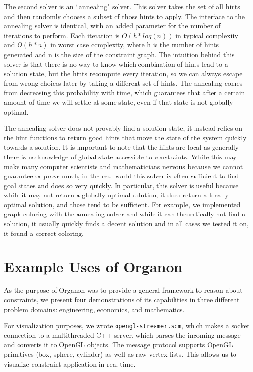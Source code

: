 \documentclass[12pt,a4paper]{article}
\begin{document}
The second solver is an ``annealing" solver. This solver takes the set of all hints and then randomly chooses a subset of those hints to apply. The interface to the annealing solver is identical, with an added parameter for the number of iterations to perform. Each iteration is $O(h * log(n))$ in typical complexity and $O(h*n)$ in worst case complexity, where h is the number of hints generated and n is the size of the constraint graph.   The intuition behind this solver is that there is no way to know which combination of hints lead to a solution state, but the hints recompute every iteration, so we can always escape from wrong choices later by taking a different set of hints.  The annealing comes from decreasing this probability with time, which guarantees that after a certain amount of time we will settle at some state, even if that state is not globally optimal.  

The annealing solver does not provably find a solution state, it instead relies on the hint functions to return good hints that move the state of the system quickly towards a solution.  It is important to note that the hints are local as generally there is no knowledge of global state accessible to constraints.  While this may make many computer scientists and mathematicians nervous because we cannot guarantee or prove much, in the real world this solver is often sufficient to find goal states and does so very quickly.  In particular, this solver is useful because while it may not return a globally optimal solution, it does return a locally optimal solution, and those tend to be sufficient.  For example, we implemented graph coloring with the annealing solver and while it can theoretically not find a solution, it usually quickly finds a decent solution and in all cases we tested it on, it found a correct coloring.

\section{Example Uses of Organon}

As the purpose of Organon was to provide a general framework to reason about constraints, we present four demonstrations of its capabilities in three different problem domains: engineering, economics, and mathematics.

For visualization purposes, we wrote \texttt{opengl-streamer.scm}, which makes a socket connection to a multithreaded C++ server, which parses the incoming message and converts it to OpenGL objects. The message protocol supports OpenGL primitives (box, sphere, cylinder) as well as raw vertex lists. This allows us to visualize constraint application in real time. 
\end{document}

